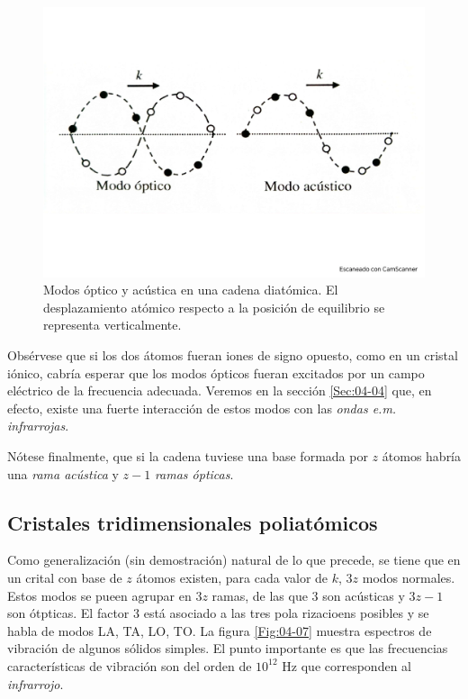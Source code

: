 \begin{figure}[h!] \centering
    \includegraphics[scale=0.42]{Cuerpo/Ch_04/Fotos libro 6.pdf}
    \caption{Modos óptico y acústica en una cadena diatómica. El desplazamiento atómico respecto a la posición de equilibrio se representa verticalmente.}
    \label{Fig:04-06}
\end{figure}    

Obsérvese que si los dos átomos fueran iones de signo opuesto, como en un cristal iónico, cabría esperar que los modos ópticos fueran excitados por un campo eléctrico de la frecuencia adecuada. Veremos en la sección \ref{Sec:04-04} que, en efecto, existe una fuerte interacción de estos modos con las \textit{ondas e.m. infrarrojas}. 

Nótese finalmente, que si la cadena tuviese una base formada por $z$ átomos habría una \textit{rama acústica} y $z-1$ \textit{ramas ópticas}.

\subsection{Cristales tridimensionales poliatómicos}

Como generalización (sin demostración) natural de lo que precede, se tiene que en un crital con base de $z$ átomos existen, para cada valor de $k$, $3z$ modos normales. Estos modos se pueen agrupar en $3z$ ramas, de las que $3$ son acústicas y $3z-1$ son ótpticas. El factor 3 está asociado a las tres pola rizacioens posibles y se habla de modos LA, TA, LO, TO. La figura \ref{Fig:04-07} muestra espectros de vibración de algunos sólidos simples. El punto importante es que las frecuencias características de vibración son del orden de $10^{12}$ Hz que corresponden al \textit{infrarrojo}.

